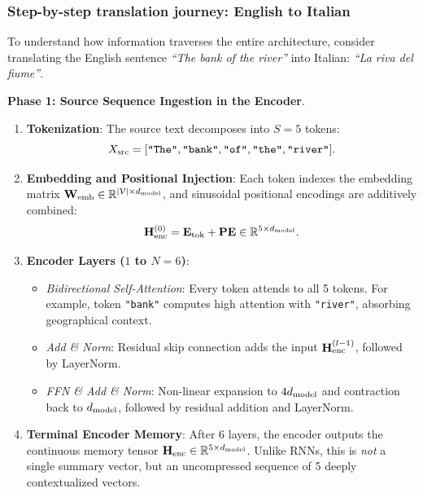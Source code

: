 \documentclass[../../../main.tex]{subfiles}
\begin{document}
\subsubsection{Step-by-step translation journey: English to Italian}
To understand how information traverses the entire architecture, consider translating the English sentence \emph{``The bank of the river''} into Italian: \emph{``La riva del fiume''}.

\noindent\textbf{Phase 1: Source Sequence Ingestion in the Encoder}.\newline
\begin{enumerate}
    \item \textbf{Tokenization}: The source text decomposes into $S = 5$ tokens:
    \begin{equation}
    X_{\text{src}} = [\text{\texttt{"The"}}, \text{\texttt{"bank"}}, \text{\texttt{"of"}}, \text{\texttt{"the"}}, \text{\texttt{"river"}}].
    \end{equation}
    \item \textbf{Embedding and Positional Injection}: Each token indexes the embedding matrix $\mathbf{W}_{\text{emb}} \in \mathbb{R}^{|\mathcal{V}| \times d_{\text{model}}}$, and sinusoidal positional encodings are additively combined:
    \begin{equation}
    \mathbf{H}_{\text{enc}}^{(0)} = \mathbf{E}_{\text{tok}} + \mathbf{PE} \in \mathbb{R}^{5 \times d_{\text{model}}}.
    \end{equation}
    \item \textbf{Encoder Layers ($1$ to $N = 6$)}:
    \begin{itemize}
        \item \emph{Bidirectional Self-Attention}: Every token attends to all 5 tokens. For example, token \texttt{"bank"} computes high attention with \texttt{"river"}, absorbing geographical context.
        \item \emph{Add \& Norm}: Residual skip connection adds the input $\mathbf{H}_{\text{enc}}^{(l-1)}$, followed by LayerNorm.
        \item \emph{FFN \& Add \& Norm}: Non-linear expansion to $4d_{\text{model}}$ and contraction back to $d_{\text{model}}$, followed by residual addition and LayerNorm.
    \end{itemize}
    \item \textbf{Terminal Encoder Memory}: After 6 layers, the encoder outputs the continuous memory tensor $\mathbf{H}_{\text{enc}} \in \mathbb{R}^{5 \times d_{\text{model}}}$. Unlike RNNs, this is \emph{not} a single summary vector, but an uncompressed sequence of 5 deeply contextualized vectors.
\end{enumerate}
\end{document}

